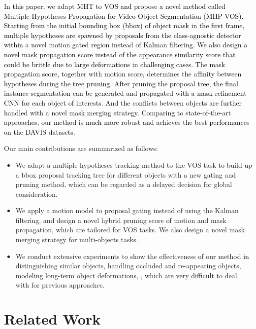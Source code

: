 \documentclass[10pt,twocolumn,letterpaper]{article}
\newcommand{\ldz}[1]{\textcolor{black}{#1}}
\begin{document}
\ldz{In this paper, we adapt MHT to VOS and propose a novel method called Multiple Hypotheses Propagation for Video Object Segmentation (MHP-VOS). Starting from the initial bounding box (bbox) of object mask in the first frame, multiple hypotheses are spawned by proposals from the class-agnostic detector within a novel motion gated region instead of Kalman filtering. 
We also design a novel mask propagation score instead of the appearance similarity score that could be brittle due to large deformations in challenging cases. 
The mask propagation score, together with motion score, determines the affinity between hypotheses during the tree pruning. 
After pruning the proposal tree, the final instance segmentation can be generated and propagated with a mask refinement CNN for each object of interests. And the conflicts between objects are further handled with a novel mask merging strategy.
Comparing to state-of-the-art approaches, our method is much more robust and achieves the best performances on the DAVIS datasets.}

Our main contributions are summarized as follows:
\begin{itemize}
\vspace{-4pt}
\item We adapt a multiple hypotheses tracking method to the VOS task to build up a bbox proposal tracking tree for different objects with a new gating and pruning method, which can be regarded as a delayed decision for global consideration. 
\vspace{-8pt}
\item We apply a motion model to proposal gating instead of using the Kalman filtering, and design a novel hybrid pruning score of motion and mask propagation, which are tailored for VOS tasks. We also design a novel mask merging strategy for multi-objects tasks.
\vspace{-8pt}
\item We conduct extensive experiments to show the effectiveness of our method in distinguishing similar objects, handling occluded and re-appearing objects, modeling long-term object deformations, \etc, which are very difficult to deal with for previous approaches.
\end{itemize}











\section{Related Work}
\end{document}
